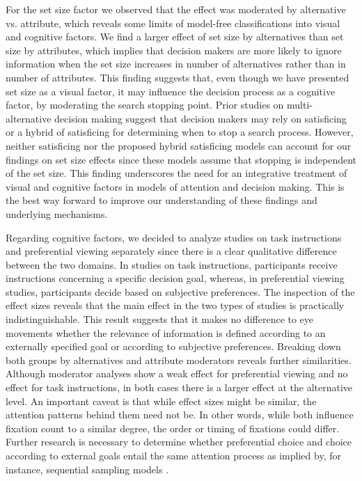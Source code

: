 For the set size factor we observed that the effect was moderated by alternative vs. attribute, which reveals some limits of model-free classifications into visual and cognitive factors. We find a larger effect of set size by alternatives than set size by attributes, which implies that decision makers are more likely to ignore information when the set size increases in number of alternatives rather than in number of attributes. This finding suggests that, even though we have presented set size as a visual factor, it may influence the decision process as a cognitive factor, by moderating the search stopping point. Prior studies on multi-alternative decision making \cite{reutskaja2011, stuttgen2012, thomas2020} suggest that decision makers may rely on satisficing or a hybrid of satisficing for determining when to stop a search process. However, neither satisficing nor the proposed hybrid satisficing models can account for our findings on set size effects since these models assume that stopping is independent of the set size. This finding underscores the need for an integrative treatment of visual and cognitive factors in models of attention and decision making. This is the best way forward to improve our understanding of these findings and underlying mechanisms.

Regarding cognitive factors, we decided to analyze studies on task instructions and preferential viewing separately since there is a clear qualitative difference between the two domains. In studies on task instructions, participants receive instructions concerning a specific decision goal, whereas, in preferential viewing studies, participants decide based on subjective preferences. The inspection of the effect sizes reveals that the main effect in the two types of studies is practically indistinguishable. This result suggests that it makes no difference to eye movements whether the relevance of information is defined according to an externally specified goal or according to subjective preferences. Breaking down both groups by alternatives and attribute moderators reveals further similarities. Although moderator analyses show a weak effect for preferential viewing and no effect for task instructions, in both cases there is a larger effect at the alternative level. An important caveat is that while effect sizes might be similar, the attention patterns behind them need not be. In other words, while both influence fixation count to a similar degree, the order or timing of fixations could differ. Further research is necessary to determine whether preferential choice and choice according to external goals entail the same attention process as implied by, for instance, sequential sampling models \citep{forstmann2016}.

